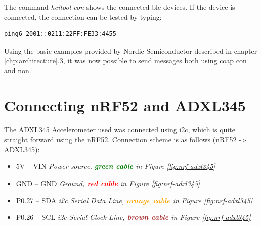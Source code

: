 The command \textit{hcitool con} shows the connected \gls{ble} devices. If the device is connected, the connection can be tested by typing:

\begin{verbatim}
ping6 2001::0211:22FF:FE33:4455
\end{verbatim}


Using the basic examples provided by Nordic Semiconductor described in chapter \ref{chp:architecture}.3, it was now possible to send messages both using \gls{coap} \gls{con} and \gls{non}.  


\section{Connecting nRF52 and ADXL345}


The ADXL345 Accelerometer used was connected using \gls{i2c}, which is quite straight forward using the nRF52. Connection scheme is as follows (nRF52 -> ADXL345): 

\begin{itemize}
  \item 5V -- VIN		\tab  	\textit{Power source, \textbf{\textcolor{green}{green cable}} in Figure \ref{fig:nrf-adxl345}}
  \item GND -- GND 		\tab 	\textit{Ground, \textbf{\textcolor{red}{red cable}} in Figure \ref{fig:nrf-adxl345}}
  \item P0.27 -- SDA	\tab	\textit{\gls{i2c} Serial Data Line, \textbf{\textcolor{orange}{orange cable}} in Figure \ref{fig:nrf-adxl345}}
  \item P0.26 -- SCL	\tab 	\textit{\gls{i2c} Serial Clock Line, \textbf{\textcolor{brown}{brown cable}} in Figure \ref{fig:nrf-adxl345}}
\end{itemize} 

